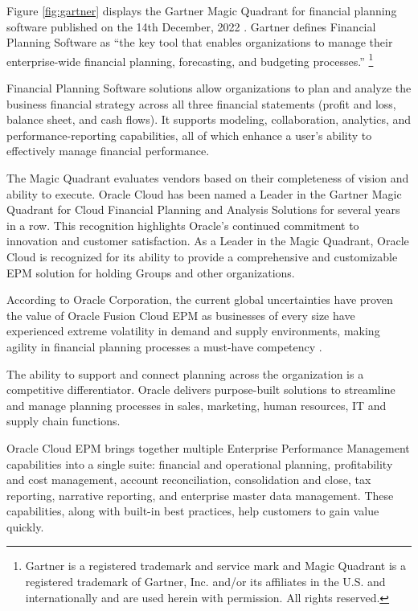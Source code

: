 \documentclass[12pt,a4paper,openright,twoside]{book}
\begin{document}
Figure \ref{fig:gartner} displays the Gartner Magic Quadrant for financial planning software published on the 14th December, 2022 \cite{gartner2022magic}.
%
Gartner defines Financial Planning Software as ``the key tool that enables organizations to manage their enterprise-wide financial planning, forecasting, and budgeting processes.'' \footnote{Gartner is a registered trademark and service mark and Magic Quadrant is a registered trademark of Gartner, Inc. and/or its affiliates in the U.S. and internationally and are used herein with permission. All rights reserved.}

Financial Planning Software solutions allow organizations to plan and analyze the business financial strategy across all three financial statements (profit and loss, balance sheet, and cash flows). 
%
It supports modeling, collaboration, analytics, and performance-reporting capabilities, all of which enhance a user’s ability to effectively manage financial performance.

The Magic Quadrant evaluates vendors based on their completeness of vision and ability to execute. 
%
Oracle Cloud has been named a Leader in the Gartner Magic Quadrant for Cloud Financial Planning and Analysis Solutions for several years in a row. 
%
This recognition highlights Oracle's continued commitment to innovation and customer satisfaction. 
%
As a Leader in the Magic Quadrant, Oracle Cloud is recognized for its ability to provide a comprehensive and customizable EPM solution for holding Groups and other organizations.

According to Oracle Corporation, the current global uncertainties have proven the value of Oracle Fusion Cloud EPM as businesses of every size have experienced extreme volatility in demand and supply environments, making agility in financial planning processes a must-have competency \cite{toomey2022oracle}.

The ability to support and connect planning across the organization is a competitive differentiator. 
%
Oracle delivers purpose-built solutions to streamline and manage planning processes in sales, marketing, human resources, IT and supply chain functions.

Oracle Cloud EPM brings together multiple Enterprise Performance Management capabilities into a single suite: financial and operational planning, profitability and cost management, account reconciliation, consolidation and close, tax reporting, narrative reporting, and enterprise master data management. 
%
These capabilities, along with built-in best practices, help customers to gain value quickly.
\end{document}
